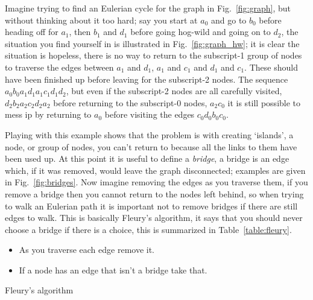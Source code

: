 \documentclass[11pt,a4paper]{scrartcl}
\begin{document}
Imagine trying to find an Eulerian cycle for the graph in
Fig.~\ref{fig:graph}, but without thinking about it too hard; say you
start at $a_0$ and go to $b_0$ before heading off for $a_1$, then
$b_1$ and $d_1$ before going hog-wild and going on to $d_2$, the
situation you find yourself in is illustrated in
Fig.~\ref{fig:graph_hw}; it is clear the situation is hopeless, there
is no way to return to the subscript-1 group of nodes to traverse the
edges between $a_1$ and $d_1$, $a_1$ and $c_1$ and $d_1$ and
$c_1$. These should have been finished up before leaving for the
subscript-2 nodes. The sequence $a_0b_0a_1d_1a_1c_1d_1d_2$, but even
if the subscript-2 nodes are all carefully visited,
$d_2b_2a_2c_2d_2a_2$ before returning to the subscript-0 nodes,
$a_2c_0$ it is still possible to mess ip by returning to $a_0$ before
visiting the edges $c_0d_0b_0c_0$.

Playing with this example shows that the problem is with creating
\lq{}islands\rq{}, a node, or group of nodes, you can't return to
because all the links to them have been used up. At this point it is
useful to define a \textsl{bridge}, a bridge is an edge which, if it
was removed, would leave the graph disconnected; examples are given in
Fig.~\ref{fig:bridges}. Now imagine removing the edges as you traverse
them, if you remove a bridge then you cannot return to the nodes left
behind, so when trying to walk an Eulerian path it is important not to
remove bridges if there are still edges to walk. This is basically
Fleury's algorithm, it says that you should never choose a bridge if
there is a choice, this is summarized in Table~\ref{table:fleury}.

\begin{table}
\begin{itemize}
\item As you traverse each edge remove it.
\item If a node has an edge that isn't a bridge take that.
\end{itemize}
\caption{Fleury's algorithm \label{table:fleury}}
\end{table}
  
\end{document}
